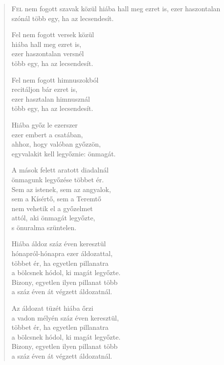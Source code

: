 
\begin{verse}

{\par%
\lettrine{F}{el} {\LettrineTextFont nem fogott szavak közül}\newline
hiába hall meg ezret is,\newline
ezer haszontalan szónál\verselinebreak
több egy, ha az lecsendesít.
\par}

 Fel nem fogott versek közül\\
hiába hall meg ezret is,\\
ezer haszontalan versnél\\
több egy, ha az lecsendesít.

 Fel nem fogott himnuszokból\\
recitáljon bár ezret is,\\
ezer hasztalan himnusznál\\
több egy, ha az lecsendesít.

 Hiába győz le ezerszer\\
ezer embert a csatában,\\
ahhoz, hogy valóban győzzön,\\
egyvalakit kell legyőznie: önmagát.

 A mások felett aratott diadalnál\\
önmagunk legyőzése többet ér.\\
Sem az istenek, sem az angyalok,\\
sem a Kísértő, sem a Teremtő\\
nem vehetik el a győzelmet\\
attól, aki önmagát legyőzte,\\
s önuralma szüntelen.

 Hiába áldoz száz éven keresztül\\
hónapról-hónapra ezer áldozattal,\\
többet ér, ha egyetlen pillanatra\\
a bölcsnek hódol, ki magát legyőzte.\\
Bizony, egyetlen ilyen pillanat több\\
a száz éven át végzett áldozatnál.

 Az áldozat tüzét hiába őrzi\\
a vadon mélyén száz éven keresztül,\\
többet ér, ha egyetlen pillanatra\\
a bölcsnek hódol, ki magát legyőzte.\\
Bizony, egyetlen ilyen pillanat több\\
a száz éven át végzett áldozatnál.


\end{verse}
